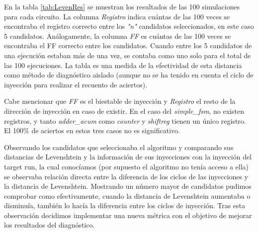 En la tabla \ref{tab:LevenRes} se muestran los resultados de las 100 simulaciones
para cada circuito. La columna \textit{Registro} indica cuántas de las 100 veces
se encontraba el registro correcto entre los \textit{"n"} candidatos
seleccionados, en este caso 5 candidatos. Análogamente, la columna
\textit{\gls{FF}} es cuántas de las 100 veces se encontraba el FF correcto entre
los candidatos. Cuando entre los 5 candidatos de una ejecución estaban más de una
vez, se contaba como uno solo para el total de las 100 ejecuciones. La tabla es
una medida de la efectividad de esta distancia como método de diagnóstico aislado
(aunque no se ha tenido en cuenta el ciclo de inyección para realizar el recuento
de aciertos).

Cabe mencionar que \textit{\gls{FF}} es el biestable de inyección y 
\textit{Registro} el resto de la dirección de inyección en caso de existir. En el
caso del \textit{simple\_fsm}, no existen registros, y tanto \textit{adder\_acum}
como \textit{counter} y \textit{shiftreg} tienen un único registro. El 100\% de 
aciertos en estos tres casos no es significativo.

Observando los candidatos que seleccionaba el algoritmo y comparando sus
distancias de Levenshtein y la información de sus inyecciones con la inyección 
del target run, la cual conocíamos (por supuesto el algoritmo no tenía acceso a 
ella) se observaba relación directa entre la diferencia de los ciclos de las
inyecciones y la distancia de Levenshtein. Mostrando un número mayor de candidatos
pudimos comprobar como efectivamente, cuando la distancia de Levenshtein
aumentaba o disminuía, también lo hacía la diferencia entre los ciclos de 
inyección. Tras esta observación decidimos implementar una nueva métrica con el
objetivo de mejorar los resultados del diagnóstico.

\endinput
